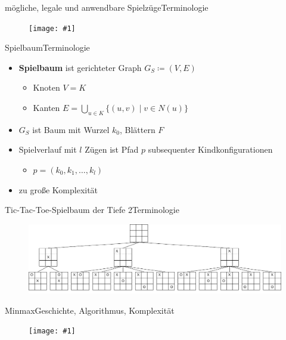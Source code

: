 \documentclass[18pt, aspectratio=169, handout]{beamer}
\newcommand\g[3]{%
  \begin{figure}[!ht]
  \centering
  \texttt{[image: \#1]}
  {\small#3}
  \end{figure}}
\newcommand\gw[2]{%
  \begin{figure}[!ht]
  \centering
  \texttt{[image: \#1]}
  {\small#2}
  \end{figure}}
\begin{document}
\begin{frame}{mögliche, legale und anwendbare Spielzüge}{Terminologie}
	\g{img/spielzuege.pdf}{1}{}
\end{frame}

\begin{frame}{Spielbaum}{Terminologie}
	\begin{itemize}
		\item \textbf{Spielbaum} ist gerichteter Graph $G_S \coloneqq (V,E)$ 
		\pause
		\begin{itemize}
			\item Knoten $V = K$
			\pause
			\item Kanten $E = \bigcup\limits_{u \in K}\{(u,v) \mid v \in N(u)\}$
		\end{itemize}

		\pause
		\item $G_S$ ist Baum mit Wurzel $k_0$, Blättern $F$
		\pause
		\item Spielverlauf mit $l$ Zügen ist Pfad $p$ subsequenter Kindkonfigurationen
		\begin{itemize}
			\item $p = (k_0,k_1,\dots,k_l)$
		\end{itemize}
		\item zu große Komplexität
	\end{itemize}
\end{frame}

\begin{frame}{Tic-Tac-Toe-Spielbaum der Tiefe 2}{Terminologie}
	\begin{figure}[!ht]
  \centering
  \includegraphics[width=\textwidth]{tic.pdf}
  \end{figure}
\end{frame}



\begin{frame}{Minmax}{Geschichte, Algorithmus, Komplexität}
  \gw{a/agenda_diagram_MinMax.pdf}{}
\end{frame}
\end{document}

